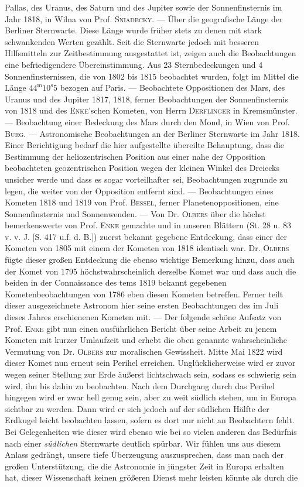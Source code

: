 Pallas, des Uranus, des Saturn und des Jupiter sowie der Sonnenfinsternis im Jahr 1818, in Wilna von Prof. \textsc{Sniadecky}. --- Über die geografische Länge der Berliner Sternwarte. Diese Länge wurde früher stets zu denen mit stark schwankenden Werten gezählt. Seit die Sternwarte jedoch mit besseren Hilfsmitteln zur Zeitbestimmung ausgestattet ist, zeigen auch die Beobachtungen eine befriedigendere Übereinstimmung. Aus 23 Sternbedeckungen und 4 Sonnenfinsternissen, die von 1802 bis 1815 beobachtet wurden, folgt im Mittel die Länge $44^{\mathrm{m}}10^{\mathrm{s}}5$ bezogen auf Paris. --- Beobachtete Oppositionen des Mars, des Uranus und des Jupiter 1817, 1818, ferner Beobachtungen der Sonnenfinsternis von 1818 und des \textsc{Enke}'schen Kometen, von Herrn \textsc{Derflinger} in Kremsmünster. --- Beobachtung einer Bedeckung des Mars durch den Mond, in Wien von Prof. \textsc{Bürg}. --- Astronomische Beobachtungen an der Berliner Sternwarte im Jahr 1818. Einer Berichtigung bedarf die hier aufgestellte übereilte Behauptung, dass die Bestimmung der heliozentrischen Position aus einer nahe der Opposition beobachteten geozentrischen Position wegen der kleinen Winkel des Dreiecks unsicher werde und dass es sogar vorteilhafter sei, Beobachtungen zugrunde zu legen, die weiter von der Opposition entfernt sind. --- Beobachtungen eines Kometen 1818 und 1819 von Prof. \textsc{Bessel}, ferner Planetenoppositionen, eine Sonnenfinsternis und Sonnenwenden. --- Von Dr. \textsc{Olbers} über die höchst bemerkenswerte  von Prof. \textsc{Enke} gemachte und in unseren Blättern (St. 28 u. 83 v. v. J. [S. 417 u.f. d. B.]) zuerst bekannt gegebene Entdeckung, dass einer der Kometen von 1805 mit einem der Kometen von 1818 identisch war. Dr. \textsc{Olbers} fügte dieser großen Entdeckung die ebenso wichtige Bemerkung hinzu, dass auch der Komet von 1795 höchstwahrscheinlich derselbe Komet war und dass auch die beiden in der Connaissance des tems 1819 bekannt gegebenen Kometenbeobachtungen von 1786 eben diesen Kometen betreffen. Ferner teilt dieser ausgezeichnete Astronom hier seine ersten Beobachtungen des im Juli dieses Jahres erschienenen Kometen mit. --- Der folgende schöne Aufsatz von Prof. \textsc{Enke} gibt nun einen ausführlichen Bericht über seine Arbeit zu jenem Kometen mit kurzer Umlaufzeit und erhebt die oben genannte wahrscheinliche Vermutung von Dr. \textsc{Olbers} zur moralischen Gewissheit. Mitte Mai 1822 wird dieser Komet nun erneut sein Perihel erreichen. Unglücklicherweise wird er zuvor wegen seiner Stellung zur Erde äußerst lichtschwach sein, sodass es schwierig sein wird, ihn bis dahin zu beobachten. Nach dem Durchgang durch das Perihel hingegen wird er zwar hell genug sein, aber zu weit südlich stehen, um in Europa sichtbar zu werden. Dann wird er sich jedoch auf der südlichen Hälfte der Erdkugel leicht beobachten lassen, sofern es dort nur nicht an Beobachtern fehlt. Bei Gelegenheiten wie dieser wird ebenso wie bei so vielen anderen das Bedürfnis nach einer \emph{südlichen} Sternwarte deutlich spürbar. Wir fühlen uns aus diesem Anlass gedrängt, unsere tiefe Überzeugung auszusprechen, dass man nach der großen Unterstützung, die die Astronomie in jüngster Zeit in Europa erhalten hat, dieser Wissenschaft keinen größeren Dienst mehr leisten könnte als durch die 